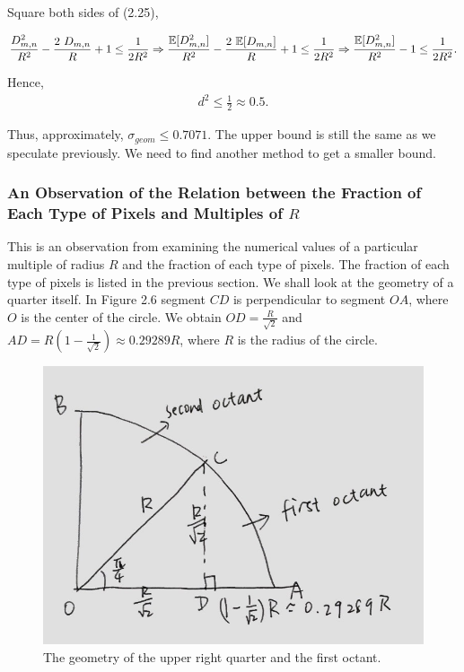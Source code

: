 \documentclass[letterpaper]{article}
\numberwithin{equation}{section} %
\numberwithin{figure}{section} %
\numberwithin{table}{section} %
\begin{document}
\noindent
Square both sides of (2.25),

\begin{equation}
\frac{D_{m,n}^2}{R^2}-\frac{2\ D_{m,n}}{R}+1 \leq \frac{1}{2R^2} \\ \Rightarrow \frac{\mathbb{E}[D_{m,n}^2]}{R^2}-\frac{2\ \mathbb{E}[D_{m,n}]}{R}+1 \leq \frac{1}{2R^2} \\
\Rightarrow \frac{\mathbb{E}[D_{m,n}^2]}{R^2}-1 \leq \frac{1}{2R^2}. \\
\end{equation}

\noindent
Hence,
\begin{align}
d^2 \leq \frac{1}{2} \approx 0.5.
\end{align}

\noindent
Thus, approximately, $\sigma_{geom} \leq 0.7071$. The upper bound is still the same as we speculate previously. We need to find another method to get a smaller bound.

\subsubsection{An Observation of the Relation between the Fraction of Each Type of Pixels and Multiples of $R$}

This is an observation from examining the numerical values of a particular multiple of radius $R$ and the fraction of each type of pixels. The fraction of each type of pixels is listed in the previous section. We shall look at the geometry of a quarter itself. In Figure 2.6 segment $CD$ is perpendicular to segment $OA$, where $O$ is the center of the circle. We obtain $OD=\frac{R}{\sqrt{2}}$ and $AD=R(1-\frac{1}{\sqrt{2}}) \approx 0.29289R$, where $R$ is the radius of the circle.

\begin{figure}[h]
	\centering
	\includegraphics[width=0.4\linewidth]{4tyMultR}
	\caption{The geometry of the upper right quarter and the first octant.}
	\label{fig:4tyMultR}
\end{figure}
\end{document}
